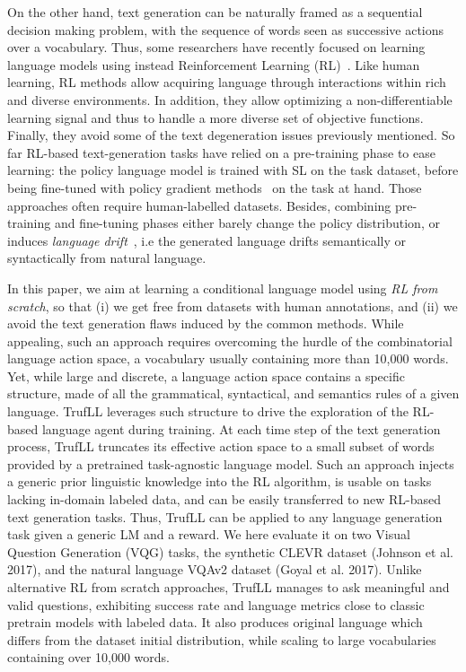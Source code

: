 \documentclass{article}
\newcommand{\algo}{TrufLL\xspace}
\begin{document}
On the other hand, text generation can be naturally framed as a sequential decision making problem, with the sequence of words seen as successive actions over a vocabulary. Thus, some researchers have recently focused on learning language models using instead Reinforcement Learning (RL)~\citep{strub2017end,das2017visual,narasimhan2015language}. 
Like human learning, RL methods allow acquiring language through interactions within rich and diverse environments. 
In addition, they allow optimizing a non-differentiable learning signal and thus to handle a more diverse set of objective functions. Finally, they avoid some of the text degeneration issues previously mentioned.
So far RL-based text-generation tasks 
have relied on a pre-training phase to ease learning: the policy language model is trained with SL on the task dataset, before being fine-tuned with policy gradient methods~\citep{sutton1999policy} on the task at hand. Those approaches often require human-labelled datasets. Besides, combining pre-training and fine-tuning phases
either barely change the policy distribution,  
or induces \textit{language drift}~\citep{lazaridou2020multi,lu2020countering}, 
i.e the generated language drifts semantically or syntactically from natural language.   


In this paper, we aim at learning a conditional language model using \textit{RL from scratch}, so that (i) we get free from datasets with human annotations, and (ii) we avoid the text generation flaws induced by the common methods. While appealing, such an approach requires overcoming the hurdle of the combinatorial language action space, a vocabulary usually containing more than 10,000 words.
Yet, while large and discrete, a language action space contains a specific structure, made of all the grammatical, syntactical, and semantics rules of a given language.
\algo leverages such structure to drive the exploration of the RL-based language agent during training. At each time step of the text generation process, \algo truncates its effective action space to a small subset of words provided by a pretrained task-agnostic language model. 
Such an approach injects a generic prior linguistic knowledge into the RL algorithm, is usable on tasks lacking in-domain labeled data, and can be easily transferred to new RL-based text generation tasks. Thus, \algo can be applied to any language generation task given a generic LM and a reward.
We here evaluate it on two Visual Question Generation (VQG) tasks, the synthetic CLEVR dataset (Johnson et al. 2017), and the natural language VQAv2 dataset (Goyal et al. 2017). Unlike alternative RL from scratch approaches, \algo manages to ask meaningful and valid questions, exhibiting success rate and language metrics close to classic pretrain models with labeled data. It also produces original language which differs from the dataset initial distribution, while scaling to large vocabularies containing over 10,000 words.
\end{document}
